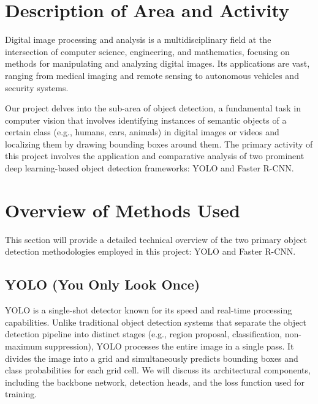 \documentclass[12pt,a4paper]{article}
\begin{document}
\newpage %

\section{Description of Area and Activity}
\label{sec:intro}

Digital image processing and analysis is a multidisciplinary field at the intersection of computer science, engineering, and mathematics, focusing on methods for manipulating and analyzing digital images. Its applications are vast, ranging from medical imaging and remote sensing to autonomous vehicles and security systems.

Our project delves into the sub-area of object detection, a fundamental task in computer vision that involves identifying instances of semantic objects of a certain class (e.g., humans, cars, animals) in digital images or videos and localizing them by drawing bounding boxes around them. The primary activity of this project involves the application and comparative analysis of two prominent deep learning-based object detection frameworks: YOLO and Faster R-CNN.

\section{Overview of Methods Used}
\label{sec:methods}

This section will provide a detailed technical overview of the two primary object detection methodologies employed in this project: YOLO and Faster R-CNN.

\subsection{YOLO (You Only Look Once)}
\label{ssec:yolo}
YOLO is a single-shot detector known for its speed and real-time processing capabilities. Unlike traditional object detection systems that separate the object detection pipeline into distinct stages (e.g., region proposal, classification, non-maximum suppression), YOLO processes the entire image in a single pass. It divides the image into a grid and simultaneously predicts bounding boxes and class probabilities for each grid cell. We will discuss its architectural components, including the backbone network, detection heads, and the loss function used for training.
\end{document}
